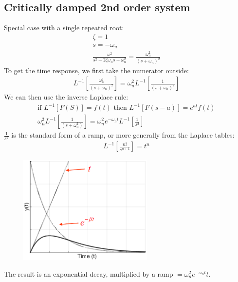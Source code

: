 \documentclass[class=report, crop=false, 12pt,a4paper]{standalone}
\begin{document}
\subsection{Critically damped 2nd order system}
Special case with a single repeated root:
\begin{gather}
  \zeta = 1\\
  s = -\omega_n\\
  \frac{\omega^2}{s^2 + 2\zeta\omega_n s+ \omega_n^2} = \frac{\omega_n^2}{(s+\omega_n)^2}
\end{gather}
To get the time response, we first take the numerator outside:
\begin{gather}
  L^{-1}\left[ \frac{\omega_n^2}{(s+\omega_n)^2} \right] = \omega_n^2 L^{-1} \left[ \frac{1}{(s+\omega_n)^2} \right]
\end{gather}
We can then use the inverse Laplace rule:
\begin{gather}
  \textrm{if } L^{-1} \left[F(S)\right] = f(t) \textrm{ then } L^{-1} \left[F(s-a)\right] = e^{at} f(t)\\[10pt]
  \omega_n^2 L^{-1} \left[\frac{1}{(s+\omega_n^2)}\right] = \omega_n^2 e^{-\omega_n t} L^{-1} \left[\frac{1}{s^2}\right]
\end{gather}
$\frac{1}{s^2}$ is the standard form of a ramp, or more generally from the Laplace tables:
\begin{align}
  L^{-1}\left[\frac{n!}{s^{n+1}}\right] = t^n
\end{align}
\begin{figure}[H]
  \centering
  \includegraphics[width = 0.6\textwidth]{../img/diagram70.png}
\end{figure}
The result is an exponential decay, multiplied by a ramp $= \omega_n^2 e^{-\omega_n t} t$.
\end{document}
